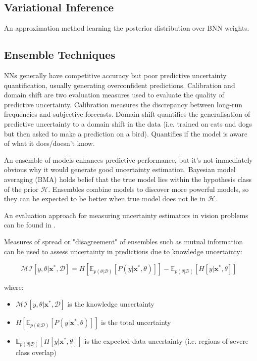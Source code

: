 \documentclass[twoside,11pt]{article}
\begin{document}
\subsection{Variational Inference}
An approximation method learning the posterior distribution over BNN weights.

\subsection{Ensemble Techniques}
NNs generally have competitive accuracy but poor predictive uncertainty quantification, usually generating overconfident predictions.
Calibration and domain shift are two evaluation measures used to evaluate the quality of predictive uncertainty.
Calibration measures the discrepancy between long-run frequencies and subjective forecasts.
Domain shift quantifies the generalisation of predictive uncertainty to a domain shift in the data (i.e. trained on cats and dogs but then asked to make a prediction on a bird).
Quantifies if the model is aware of what it does/doesn't know.

An ensemble of models enhances predictive performance, but it's not immediately obvious why it would generate good uncertainty estimation.
Bayesian model averaging (BMA) holds belief that the true model lies within the hypothesis class of the prior $\mathcal{H}$.
Ensembles combine models to discover more powerful models, so they can be expected to be better when true model does not lie in $\mathcal{H}$.

An evaluation approach for measuring uncertainty estimators in vision problems can be found in \cite{gustafsson2020evaluating}.

Measures of spread or "disagreement" of ensembles such as mutual information can be used to assess uncertainty in predictions due to knowledge uncertainty:

\[\mathcal{MI}\left[y, \theta | \textbf{x}^{*}, \mathcal{D}\right] = H[\mathbb{E}_{p(\theta | \mathcal{D})} [P(y|\textbf{x}^{*}, \theta)]] - \mathbb{E}_{p(\theta | \mathcal{D})}[H[y|\textbf{x}^{*}, \theta]]\]

where:
\begin{itemize}
\item $\mathcal{MI}\left[y, \theta | \textbf{x}^{*}, \mathcal{D}\right]$ is the knowledge uncertainty
\item $H[\mathbb{E}_{p(\theta | \mathcal{D})} [P(y|\textbf{x}^{*}, \theta)]]$ is the total uncertainty
\item $\mathbb{E}_{p(\theta | \mathcal{D})}[H[y|\textbf{x}^{*}, \theta]]$ is the expected data uncertainty (i.e. regions of severe class overlap)
\end{itemize}
\end{document}
